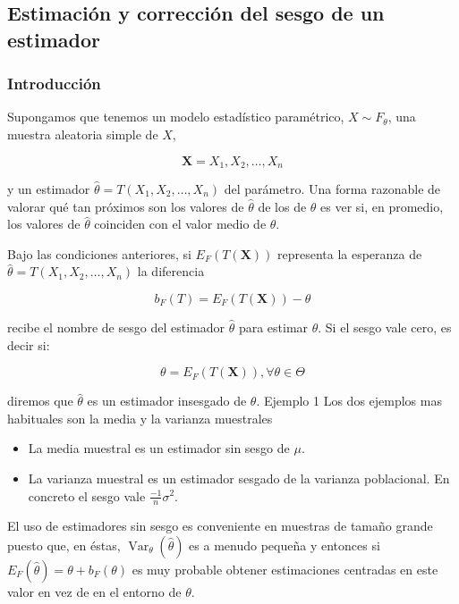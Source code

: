 \documentclass[
]{article}
\providecommand{\tightlist}{%
  \setlength{\itemsep}{0pt}\setlength{\parskip}{0pt}}
\begin{document}
\subsection{Estimación y corrección del sesgo de un estimador}\label{estimaciuxf3n-y-correcciuxf3n-del-sesgo-de-un-estimador}

\subsubsection{Introducción}\label{introducciuxf3n-10}

Supongamos que tenemos un modelo estadístico paramétrico, \(X \sim F_{\theta}\), una muestra aleatoria simple de \(X\),

\[
\mathbf{X}=X_{1}, X_{2}, \ldots, X_{n}
\]

y un estimador \(\hat{\theta}=T\left(X_{1}, X_{2}, \ldots, X_{n}\right)\) del parámetro. Una forma razonable de valorar qué tan próximos son los valores de \(\hat{\theta}\) de los de \(\theta\) es ver si, en promedio, los valores de \(\hat{\theta}\) coinciden con el valor medio de \(\theta\).

Bajo las condiciones anteriores, si \(E_{F}(T(\mathbf{X}))\) representa la esperanza de \(\hat{\theta}=T\left(X_{1}, X_{2}, \ldots, X_{n}\right)\) la diferencia

\[
b_{F}(T)=E_{F}(T(\mathbf{X}))-\theta
\]

recibe el nombre de sesgo del estimador \(\hat{\theta}\) para estimar \(\theta\). Si el sesgo vale cero, es decir si:

\[
\theta=E_{F}(T(\mathbf{X})), \forall \theta \in \Theta
\]

diremos que \(\hat{\theta}\) es un estimador insesgado de \(\theta\).
Ejemplo 1 Los dos ejemplos mas habituales son la media y la varianza muestrales

\begin{itemize}
\tightlist
\item
  La media muestral es un estimador sin sesgo de \(\mu\).
\item
  La varianza muestral es un estimador sesgado de la varianza poblacional. En concreto el sesgo vale \(\frac{-1}{n} \sigma^{2}\).
\end{itemize}

El uso de estimadores sin sesgo es conveniente en muestras de tamaño grande puesto que, en éstas, \(\operatorname{Var}_{\theta}(\hat{\theta})\) es a menudo pequeña y entonces si \(E_{F}(\hat{\theta})=\theta+b_{F}(\theta)\) es muy probable obtener estimaciones centradas en este valor en vez de en el entorno de \(\theta\).
\end{document}
